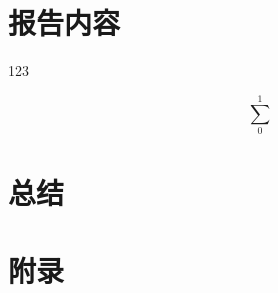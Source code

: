 \documentclass[10pt, a4paper]{article}
\begin{document}



\newpage
\section{报告内容} \label{ch1}

123\cite{G1904}

\begin{equation}
    \sum_0^1
\end{equation}


\newpage
\section{总结} \label{ch2}
 
\cite{G1904}
\newpage
{}
 


\newpage
\section{附录} \label{ch3}



\end{document}

